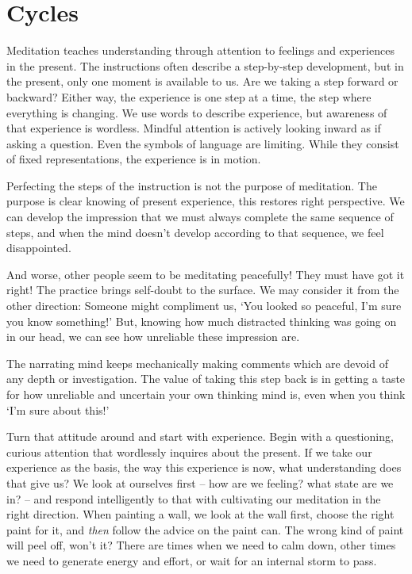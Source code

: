 \chapter{Cycles}


Meditation teaches understanding through attention to feelings and
experiences in the present. The instructions often describe a
step-by-step development, but in the present, only one moment is
available to us. Are we taking a step forward or backward? Either way,
the experience is one step at a time, the step where everything is
changing. We use words to describe experience, but awareness of that
experience is wordless. Mindful attention is actively looking inward as
if asking a question. Even the symbols of language are limiting. While
they consist of fixed representations, the experience is in motion.

Perfecting the steps of the instruction is not the purpose of
meditation. The purpose is clear knowing of present experience, this
restores right perspective. We can develop the impression that we must
always complete the same sequence of steps, and when the mind doesn't
develop according to that sequence, we feel disappointed.


And worse, other people seem to be meditating peacefully! They must have
got it right! The practice brings self-doubt to the surface. We may
consider it from the other direction: Someone might compliment us, `You
looked so peaceful, I'm sure you know something!' But, knowing how much
distracted thinking was going on in our head, we can see how unreliable
these impression are.

The narrating mind keeps mechanically making comments which are devoid
of any depth or investigation. The value of taking this step back is in
getting a taste for how unreliable and uncertain your own thinking mind
is, even when you think `I'm sure about this!'

Turn that attitude around and start with experience. Begin with a
questioning, curious attention that wordlessly inquires about the
present. If we take our experience as the basis, the way this experience
is now, what understanding does that give us? We look at ourselves first
-- how are we feeling? what state are we in? -- and respond
intelligently to that with cultivating our meditation in the right
direction. When painting a wall, we look at the wall first, choose the
right paint for it, and \emph{then} follow the advice on the paint can.
The wrong kind of paint will peel off, won't it? There are times when we
need to calm down, other times we need to generate energy and effort, or
wait for an internal storm to pass.

